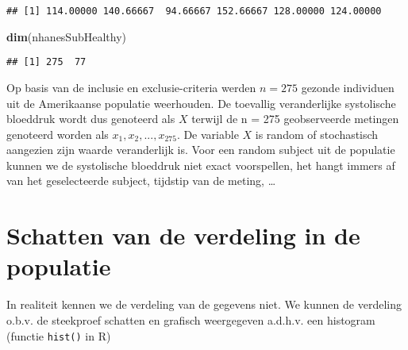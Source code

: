\documentclass[12pt,dutch,coursenotes]{book}
\newenvironment{Shaded}{\begin{snugshade}}{\end{snugshade}}
\newcommand{\KeywordTok}[1]{\textcolor[rgb]{0.13,0.29,0.53}{\textbf{#1}}}
\newcommand{\DataTypeTok}[1]{\textcolor[rgb]{0.13,0.29,0.53}{#1}}
\newcommand{\DecValTok}[1]{\textcolor[rgb]{0.00,0.00,0.81}{#1}}
\newcommand{\FloatTok}[1]{\textcolor[rgb]{0.00,0.00,0.81}{#1}}
\newcommand{\StringTok}[1]{\textcolor[rgb]{0.31,0.60,0.02}{#1}}
\newcommand{\OperatorTok}[1]{\textcolor[rgb]{0.81,0.36,0.00}{\textbf{#1}}}
\newcommand{\NormalTok}[1]{#1}
\theoremstyle{definition}
\theoremstyle{definition}
\theoremstyle{definition}
\theoremstyle{remark}
\begin{document}
\begin{verbatim}
## [1] 114.00000 140.66667  94.66667 152.66667 128.00000 124.00000
\end{verbatim}

\begin{Shaded}
\begin{Highlighting}[]
\KeywordTok{dim}\NormalTok{(nhanesSubHealthy)}
\end{Highlighting}
\end{Shaded}

\begin{verbatim}
## [1] 275  77
\end{verbatim}

Op basis van de inclusie en exclusie-criteria werden \(n=275\) gezonde
individuen uit de Amerikaanse populatie weerhouden. De toevallig
veranderlijke systolische bloeddruk wordt dus genoteerd als \(X\)
terwijl de n = 275 geobserveerde metingen genoteerd worden als
\(x_1,x_2,...,x_{275}\). De variable \(X\) is random of stochastisch
aangezien zijn waarde veranderlijk is. Voor een random subject uit de
populatie kunnen we de systolische bloeddruk niet exact voorspellen, het
hangt immers af van het geselecteerde subject, tijdstip van de meting,
\ldots{}

\section{Schatten van de verdeling in de
populatie}\label{schatten-van-de-verdeling-in-de-populatie}

In realiteit kennen we de verdeling van de gegevens niet. We kunnen de
verdeling o.b.v. de steekproef schatten en grafisch weergegeven a.d.h.v.
een histogram (functie \texttt{hist()} in R)

\begin{Shaded}
\end{Shaded}
\end{document}
